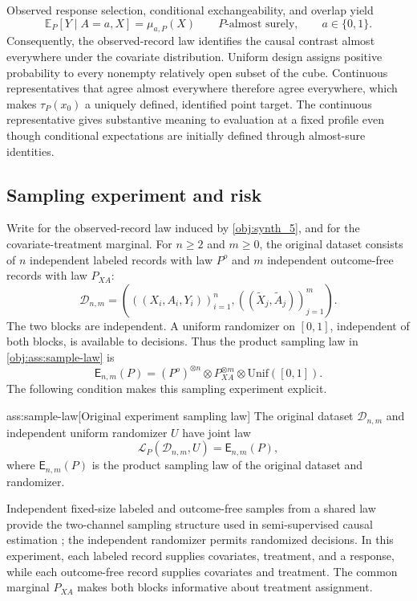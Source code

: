 Observed response selection, conditional exchangeability, and overlap yield
\[
\mathbb E_P[Y\mid A=a,X]=\mu_{a,P}(X)
\qquad P\text{-almost surely},\qquad a\in\{0,1\}.
\]
Consequently, the observed-record law identifies the causal contrast almost everywhere under the covariate distribution. Uniform design assigns positive probability to every nonempty relatively open subset of the cube. Continuous representatives that agree almost everywhere therefore agree everywhere, which makes \(\tau_P(x_0)\) a uniquely defined, identified point target. The continuous representative gives substantive meaning to evaluation at a fixed profile even though conditional expectations are initially defined through almost-sure identities.

\subsection{Sampling experiment and risk}

Write  for the observed-record law induced by \cref{obj:synth_5}, and  for the covariate-treatment marginal. For \(n\ge2\) and \(m\ge0\), the original dataset  consists of \(n\) independent labeled records with law \(P^o\) and \(m\) independent outcome-free records with law \(P_{XA}\):
\[
\mathcal D_{n,m}
=
\left(
((X_i,A_i,Y_i))_{i=1}^{n},
((\widetilde X_j,\widetilde A_j))_{j=1}^{m}
\right).
\]
The two blocks are independent. A uniform randomizer  on \([0,1]\), independent of both blocks, is available to decisions. Thus the product sampling law  in \cref{obj:ass:sample-law} is
\[
\mathsf E_{n,m}(P)
=
(P^o)^{\otimes n}
\otimes P_{XA}^{\otimes m}
\otimes\mathrm{Unif}([0,1]).
\]
The following condition makes this sampling experiment explicit.

\begin{assumptionv}{ass:sample-law}[Original experiment sampling law]
The original dataset \(\mathcal D_{n,m}\) and independent uniform randomizer \(U\) have joint law
\[
\mathcal L_P(\mathcal D_{n,m},U)=\mathsf E_{n,m}(P),
\]
where \(\mathsf E_{n,m}(P)\) is the product sampling law of the original dataset and randomizer.
\end{assumptionv}

Independent fixed-size labeled and outcome-free samples from a shared law provide the two-channel sampling structure used in semi-supervised causal estimation \citep{ChakraborttyDai2022}; the independent randomizer permits randomized decisions. In this experiment, each labeled record supplies covariates, treatment, and a response, while each outcome-free record supplies covariates and treatment. The common marginal \(P_{XA}\) makes both blocks informative about treatment assignment.

